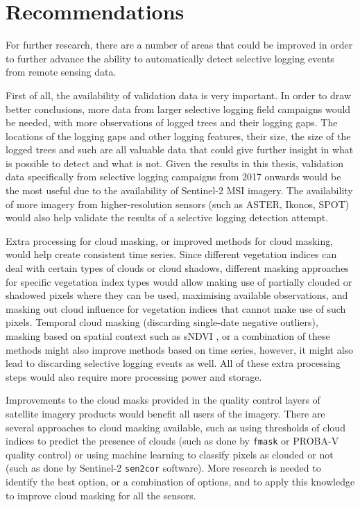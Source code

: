\documentclass[a4paper,12pt]{scrbook}
\begin{document}
\section{Recommendations}

For further research, there are a number of areas that could be improved in order to further advance the ability to automatically detect selective logging events from remote sensing data.

First of all, the availability of validation data is very important. In order to draw better conclusions, more data from larger selective logging field campaigns would be needed, with more observations of logged trees and their logging gaps. The locations of the logging gaps and other logging features, their size, the size of the logged trees and such are all valuable data that could give further insight in what is possible to detect and what is not. Given the results in this thesis, validation data specifically from selective logging campaigns from 2017 onwards would be the most useful due to the availability of Sentinel-2 \ac{MSI} imagery. The availability of more imagery from higher-resolution sensors (such as ASTER, Ikonos, SPOT) would also help validate the results of a selective logging detection attempt.

Extra processing for cloud masking, or improved methods for cloud masking, would help create consistent time series. Since different vegetation indices can deal with certain types of clouds or cloud shadows, different masking approaches for specific vegetation index types would allow making use of partially clouded or shadowed pixels where they can be used, maximising available observations, and masking out cloud influence for vegetation indices that cannot make use of such pixels. Temporal cloud masking (discarding single-date negative outliers), masking based on spatial context such as sNDVI \citep{hamunyela_using_2016}, or a combination of these methods might also improve methods based on time series, however, it might also lead to discarding selective logging events as well. All of these extra processing steps would also require more processing power and storage.

Improvements to the cloud masks provided in the quality control layers of satellite imagery products would benefit all users of the imagery. There are several approaches to cloud masking available, such as using thresholds of cloud indices to predict the presence of clouds (such as done by \texttt{fmask} or PROBA-V quality control) or using machine learning to classify pixels as clouded or not (such as done by Sentinel-2 \texttt{sen2cor} software). More research is needed to identify the best option, or a combination of options, and to apply this knowledge to improve cloud masking for all the sensors.
\end{document}
